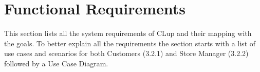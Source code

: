 \section{Functional Requirements}

This section lists all the system requirements of CLup and their mapping with the goals. To better explain all the requirements the section starts with a list of use cases and scenarios for both Customers (3.2.1) and Store Manager (3.2.2) followed by a Use Case Diagram.







 
 